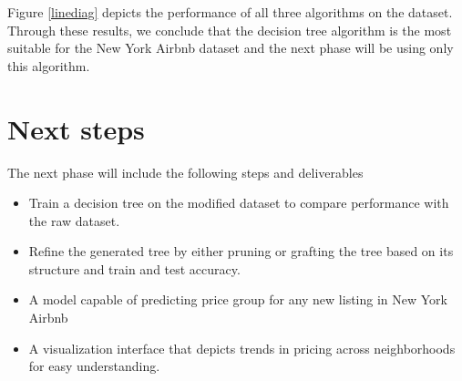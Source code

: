 \documentclass{sig-alternate}
\begin{document}
Figure \ref{linediag} depicts the performance of all three algorithms on the dataset. Through these results, we conclude that the decision tree algorithm is the most suitable for the New York Airbnb dataset and the next phase will be using only this algorithm.
\section{Next steps} 
The next phase will include the following steps and deliverables
\begin{itemize}
	\item Train a decision tree on the modified dataset to compare performance with the raw dataset.
	\item Refine the generated tree by either pruning or grafting the tree based on its structure and train and test accuracy.
	\item A model capable of predicting price group for any new listing in New York Airbnb
	\item A visualization interface that depicts trends in pricing across neighborhoods for easy understanding.
\end{itemize}
	
	
	
\end{document}
